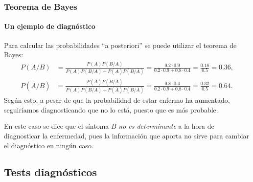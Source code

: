 \begin{frame}
\frametitle{Teorema de Bayes}
\framesubtitle{Un ejemplo de diagnóstico}
Para calcular las probabilidades ``a posteriori'' se puede utilizar el teorema de Bayes:
\begin{align*}
P(A/B) &= \frac{P(A)P(B/A)}{P(A)P(B/A)+P(\overline A)P(B/\overline A)} = \frac{0.2\cdot 0.9}{0.2\cdot 0.9 + 0.8\cdot 0.4} = \frac{0.18}{0.5}=0.36,\\
P(\overline A/B) &= \frac{P(\overline A)P(B/\overline A)}{P(A)P(B/A)+P(\overline A)P(B/\overline A)} = \frac{0.8\cdot 0.4}{0.2\cdot 0.9 + 0.8\cdot 0.4} = \frac{0.32}{0.5}=0.64.
\end{align*}
Según esto, a pesar de que la probabilidad de estar enfermo ha aumentado, seguiríamos diagnosticando que no lo está, puesto que es más
probable.

En este caso se dice que el síntoma $B$ \emph{no es determinante} a la hora de diagnosticar la enfermedad, pues la información que aporta no
sirve para cambiar el diagnóstico en ningún caso.

\end{frame}

\subsection{Tests diagnósticos}

